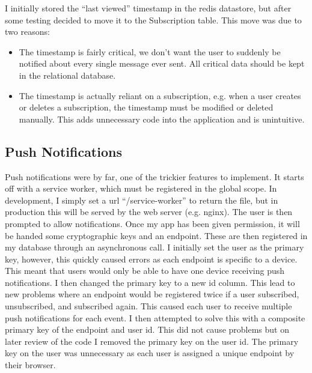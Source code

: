 \documentclass[a4paper,oneside,12pt,draft]{report}
\begin{document}
	I initially stored the “last viewed” timestamp in the redis datastore, but after some testing decided to move it to the Subscription table. This move was due to two reasons:
	\begin{itemize}
		\item The timestamp is fairly critical, we don't want the user to suddenly be notified about every single message ever sent. All critical data should be kept in the relational database.
		\item The timestamp is actually reliant on a subscription, e.g. when a user creates or deletes a subscription, the timestamp must be modified or deleted manually. This adds unnecessary code into the application and is unintuitive.
	\end{itemize}

	\subsection{Push Notifications}
	Push notifications were by far, one of the trickier features to implement. It starts off with a service worker, which must be registered in the global scope. In development, I simply set a url “/service-worker” to return the file, but in production this will be served by the web server (e.g. nginx). The user is then prompted to allow notifications. Once my app has been given permission, it will be handed some cryptographic keys and an endpoint. These are then registered in my database through an asynchronous call. I initially set the user as the primary key, however, this quickly caused errors as each endpoint is specific to a device. This meant that users would only be able to have one device receiving push notifications. I then changed the primary key to a new id column. This lead to new problems where an endpoint would be registered twice if a user subscribed, unsubscribed, and subscribed again. This caused each user to receive multiple push notifications for each event. I then attempted to solve this with a composite primary key of the endpoint and user id. This did not cause problems but on later review of the code I removed the primary key on the user id. The primary key on the user was unnecessary as each user is assigned a unique endpoint by their browser.
\end{document}
